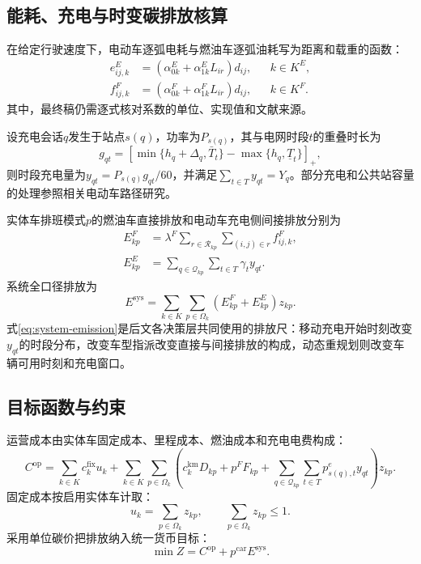 \subsection{能耗、充电与时变碳排放核算}

在给定行驶速度下，电动车逐弧电耗与燃油车逐弧油耗写为距离和载重的函数：
\begin{align}
e^E_{ij,k}&=(\alpha_{0k}^E+\alpha_{1k}^E L_{ir})d_{ij}, && k\in K^E,\label{eq:ev-energy}\\
f^F_{ij,k}&=(\alpha_{0k}^F+\alpha_{1k}^F L_{ir})d_{ij}, && k\in K^F.\label{eq:cv-fuel}
\end{align}
其中，最终稿仍需逐式核对系数的单位、实现值和文献来源\cite{ref:goeke-2015}。

设充电会话$q$发生于站点$s(q)$，功率为$P_{s(q)}$，其与电网时段$t$的重叠时长为
\begin{equation}
g_{qt}=\left[\min\{h_q+\Delta_q,\bar T_t\}-\max\{h_q,\underline T_t\}\right]_+,
\label{eq:charge-overlap}
\end{equation}
则时段充电量为$y_{qt}=P_{s(q)}g_{qt}/60$，并满足$\sum_{t\in T}y_{qt}=Y_q$。部分充电和公共站容量的处理参照相关电动车路径研究\cite{ref:froger-2022,ref:keskin-2016}。

实体车排班模式$p$的燃油车直接排放和电动车充电侧间接排放分别为
\begin{align}
E_{kp}^{F}&=\lambda^F\sum_{r\in\mathcal R_{kp}}\sum_{(i,j)\in r}f^F_{ij,k},\label{eq:cv-emission}\\
E_{kp}^{E}&=\sum_{q\in\mathcal Q_{kp}}\sum_{t\in T}\gamma_ty_{qt}.\label{eq:ev-emission}
\end{align}
系统全口径排放为
\begin{equation}
E^{\mathrm{sys}}=\sum_{k\in K}\sum_{p\in\Omega_k}(E_{kp}^{F}+E_{kp}^{E})z_{kp}.
\label{eq:system-emission}
\end{equation}
式\eqref{eq:system-emission}是后文各决策层共同使用的排放尺：移动充电开始时刻改变$y_{qt}$的时段分布，改变车型指派改变直接与间接排放的构成，动态重规划则改变车辆可用时刻和充电窗口。

\subsection{目标函数与约束}

运营成本由实体车固定成本、里程成本、燃油成本和充电电费构成：
\begin{equation}
C^{\mathrm{op}}=\sum_{k\in K}c_k^{\mathrm{fix}}u_k+
\sum_{k\in K}\sum_{p\in\Omega_k}\left(c_k^{\mathrm{km}}D_{kp}+p^FF_{kp}+
\sum_{q\in\mathcal Q_{kp}}\sum_{t\in T}p^e_{s(q),t}y_{qt}\right)z_{kp}.
\label{eq:operation-cost}
\end{equation}
固定成本按启用实体车计取：
\begin{equation}
u_k=\sum_{p\in\Omega_k}z_{kp},\qquad \sum_{p\in\Omega_k}z_{kp}\leq 1.
\label{eq:vehicle-use}
\end{equation}
采用单位碳价把排放纳入统一货币目标：
\begin{equation}
\min Z=C^{\mathrm{op}}+p^{\mathrm{car}}E^{\mathrm{sys}}.
\label{eq:objective}
\end{equation}

